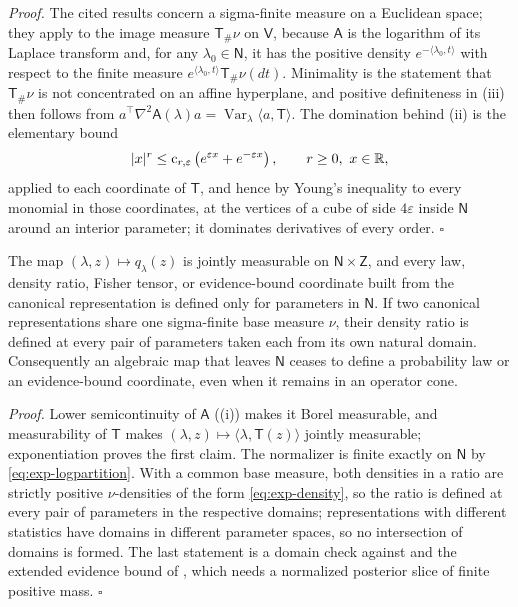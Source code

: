 \noindent\emph{Proof.}
The cited results concern a sigma-finite measure on a Euclidean space; they
apply to the image measure \(\mathsf T_\#\nu\) on \(\mathsf V\), because
\(\mathsf A\) is the logarithm of its Laplace transform and, for any
\(\lambda_0\in\mathsf N\), it has the positive density
\(e^{-\langle\lambda_0,t\rangle}\) with respect to the finite measure
\(e^{\langle\lambda_0,t\rangle}\mathsf T_\#\nu(dt)\). Minimality is the
statement that \(\mathsf T_\#\nu\) is not concentrated on an affine
hyperplane, and positive definiteness in (iii) then follows from
\(a^\top\nabla^2\mathsf A(\lambda)a=\operatorname{Var}_\lambda\langle a,\mathsf T\rangle\).
The domination behind (ii) is the elementary bound
\begin{equation}
|x|^r\leq \mathrm c_{r,\varepsilon}\left(e^{\varepsilon x}+e^{-\varepsilon x}\right),
\qquad r\geq0,\ x\in\mathbb R,
\label{eq:exp-domination}
\end{equation}
applied to each coordinate of \(\mathsf T\), and hence by Young's inequality to
every monomial in those coordinates, at the vertices of a cube of side
\(4\varepsilon\) inside \(\mathsf N\) around an interior parameter; it dominates
derivatives of every order.
\(\square\)

The map \((\lambda,z)\mapsto q_\lambda(z)\) is jointly measurable on
\(\mathsf N\times\mathsf Z\), and every law, density ratio, Fisher tensor, or
evidence-bound coordinate built from the canonical representation is defined
only for parameters in \(\mathsf N\). If two canonical representations share
one sigma-finite base measure \(\nu\), their density ratio is defined at every
pair of parameters taken each from its own natural domain. Consequently an
algebraic map that leaves \(\mathsf N\) ceases to define a probability law or
an evidence-bound coordinate, even when it remains in an operator cone.

\noindent\emph{Proof.}
Lower semicontinuity of \(\mathsf A\)
((i)) makes it Borel measurable, and
measurability of \(\mathsf T\) makes \((\lambda,z)\mapsto\langle\lambda,
\mathsf T(z)\rangle\) jointly measurable; exponentiation proves the first
claim. The normalizer is finite exactly on \(\mathsf N\) by
\eqref{eq:exp-logpartition}. With a common base measure, both densities in a
ratio are strictly positive \(\nu\)-densities of the form
\eqref{eq:exp-density}, so the ratio is defined at every pair of parameters in
the respective domains; representations with different statistics have
domains in different parameter spaces, so no intersection of domains is
formed. The last statement is a domain check against
 and the extended evidence bound of
, which needs a normalized posterior slice of finite
positive mass. \(\square\)

